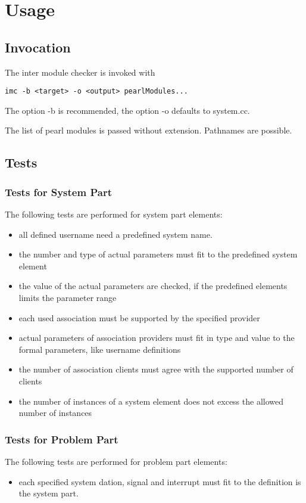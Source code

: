 \chapter{Usage}

\section{Invocation}
The inter module checker is invoked with
\begin{verbatim}
imc -b <target> -o <output> pearlModules...
\end{verbatim}

The option -b is  recommended, the option -o defaults to system.cc.

The list of pearl modules is passed without extension. Pathnames are 
possible.


\section{Tests}
\subsection{Tests for System Part}
The following tests are performed for system part elements:
\begin{itemize}
\item all defined username need a predefined system name.
\item the number and type of actual parameters must fit to the 
      predefined system element
\item the value of the actual parameters are checked, if the predefined
   elements limits the parameter range
\item each used association must be supported by the specified provider
\item actual parameters of association providers must fit in type and value
   to the formal parameters, like username definitions
\item the number of association clients must agree with the supported
    number of clients
\item the number of instances of a system element does not excess the 
   allowed number of instances
\end{itemize}

\subsection{Tests for Problem Part}
The following tests are performed for problem part elements:
\begin{itemize}
\item each specified system dation, signal and interrupt must fit
  to the definition is the system part.
\end{itemize}


